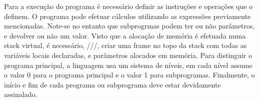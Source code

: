 Para a execução do programa é necessário definir as instruções e operações que o definem. O programa pode efetuar cálculos utilizando as expressões previamente mencionadas. Note-se no entanto que subprogrmas podem ter ou não parâmetros, e devolver ou não um valor. Visto que a alocação de memória é efetuada numa stack virtual, é necessário, ///, criar uma frame no topo da stack com todas as variáveis locais declaradas, e parâmetros alocados em memória. Para distinguir o programa principal, a linguagem usa um sistema de níveis, em cada nível assume o valor 0 para o programa principal e o valor 1 para subprogramas. Finalmente, o início e fim de cada programa ou subprograma deve estar devidamente assinalado.  

   




 



